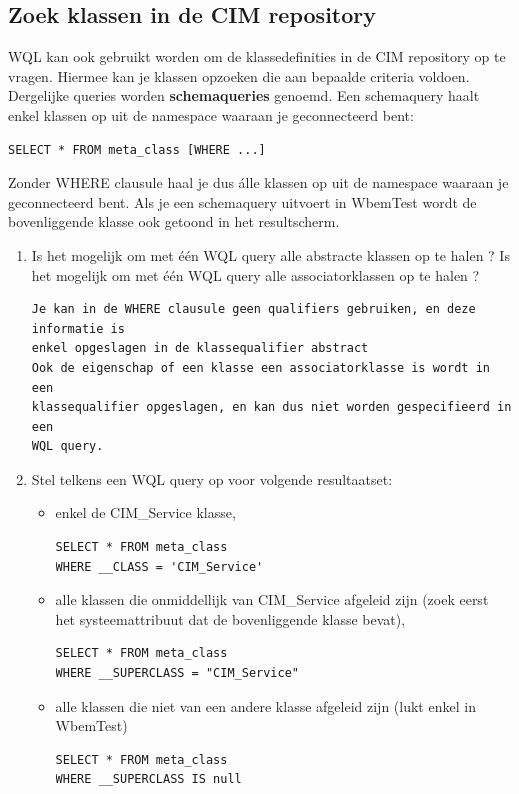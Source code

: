 \documentclass[11pt,a4paper]{report}
\begin{document}
\subsection{Zoek klassen in de CIM repository}
WQL kan ook gebruikt worden om de klassedefinities in de CIM repository op te vragen. Hiermee kan je klassen opzoeken die aan bepaalde criteria voldoen. Dergelijke queries worden \textbf{schemaqueries} genoemd.
Een schemaquery haalt enkel klassen op uit de namespace waaraan je geconnecteerd bent:
\begin{lstlisting}
SELECT * FROM meta_class [WHERE ...]
\end{lstlisting}
Zonder WHERE clausule haal je dus álle klassen op uit de namespace waaraan je geconnecteerd bent.
Als je een schemaquery uitvoert in WbemTest wordt de bovenliggende klasse ook getoond in het resultscherm.
\begin{enumerate}[resume]
	\item Is het mogelijk om met één WQL query alle abstracte klassen op te halen ? Is het mogelijk om met één WQL query alle associatorklassen op te halen ?
	\begin{lstlisting}
Je kan in de WHERE clausule geen qualifiers gebruiken, en deze informatie is 
enkel opgeslagen in de klassequalifier abstract
Ook de eigenschap of een klasse een associatorklasse is wordt in een 
klassequalifier opgeslagen, en kan dus niet worden gespecifieerd in een 
WQL query.
	\end{lstlisting}
	\item Stel telkens een WQL query op voor volgende resultaatset:
	\begin{itemize}
		\item enkel de CIM\_Service klasse,
		\begin{lstlisting}
SELECT * FROM meta_class
WHERE __CLASS = 'CIM_Service'
		\end{lstlisting}
		\item alle klassen die onmiddellijk van CIM\_Service afgeleid zijn (zoek eerst het systeemattribuut dat de bovenliggende klasse bevat),
		\begin{lstlisting}
SELECT * FROM meta_class
WHERE __SUPERCLASS = "CIM_Service"
		\end{lstlisting}
		\item alle klassen die niet van een andere klasse afgeleid zijn (lukt enkel in WbemTest)
		\begin{lstlisting}
SELECT * FROM meta_class
WHERE __SUPERCLASS IS null
		\end{lstlisting}
	\end{itemize}	
\end{enumerate}
\end{document}
